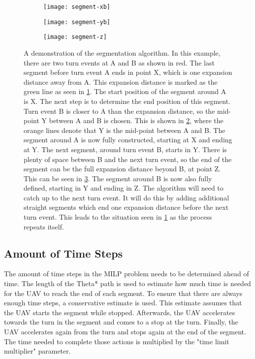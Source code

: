 \begin{figure}[h]
	\centering
	\begin{subfigure}[t]{0.3\columnwidth}
        		\texttt{[image: segment-xb]}
        		\caption{}
        		 \label{fig:segment-demo-x}
	\end{subfigure}	
	\hfill
	\begin{subfigure}[t]{0.3\columnwidth}
        		\texttt{[image: segment-yb]}
        		\caption{}
        		 \label{fig:segment-demo-y}
	\end{subfigure}	
		\hfill
	\begin{subfigure}[t]{0.3\columnwidth}
        		\texttt{[image: segment-z]}
        		\caption{}
        		 \label{fig:segment-demo-z}
	\end{subfigure}	
	\caption[A demonstration of the segmentation algorithm]{A demonstration of the segmentation algorithm. In this example, there are two turn events at A and B as shown in red. The last segment before turn event A ends in point X, which is one expansion distance away from A. This expansion distance is marked as the green line as seen in \ref{fig:segment-demo-x}. The start position of the segment around A is X. The next step is to determine the end position of this segment. Turn event B is closer to A than the expansion distance, so the mid-point Y between A and B is chosen. This is shown in \ref{fig:segment-demo-y}, where the orange lines denote that Y is the mid-point between A and B. The segment around A is now fully constructed, starting at X and ending at Y. The next segment, around turn event B, starts in Y. There is plenty of space between B and the next turn event, so the end of the segment can be the full expansion distance beyond B, at point Z. This can be seen in \ref{fig:segment-demo-z}. The segment around B is now also fully defined, starting in Y and ending in Z. The algorithm will need to catch up to the next turn event. It will do this by adding additional straight segments which end one expansion distance before the next turn event. This leads to the situation seen in \ref{fig:segment-demo-x} as the process repeats itself.}
    \label{fig:segment-demo}     
\end{figure}

\subsection{Amount of Time Steps}
The amount of time steps in the MILP problem needs to be determined ahead of time. The length of the Theta* path is used to estimate how much time is needed for the UAV to reach the end of each segment. To ensure that there are always enough time steps, a conservative estimate is used. This estimate assumes that the UAV starts the segment while stopped. Afterwards, the UAV accelerates towards the turn in the segment and comes to a stop at the turn. Finally, the UAV accelerates again from the turn and stops again at the end of the segment. The time needed to complete those actions is multiplied by the "time limit multiplier" parameter.

